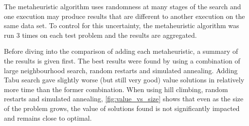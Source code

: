 The metaheuristic algorithm uses randomness at many stages of the search and one execution may produce results that are different to another execution on the same data set. To control for this uncertainty, the metaheuristic algorithm was run 3 times on each test problem and the results are aggregated.

Before diving into the comparison of adding each metaheuristic, a summary of the results is given first. The best results were found by using a combination of large neighbourhood search, random restarts and simulated annealing. Adding Tabu search gave slightly worse (but still very good) value solutions in relatively more time than the former combination. When using hill climbing, random restarts and simulated annealing, \cref{fig:value_vs_size} shows that even as the size of the problem grows, the value of solutions found is not significantly impacted and remains close to optimal.

